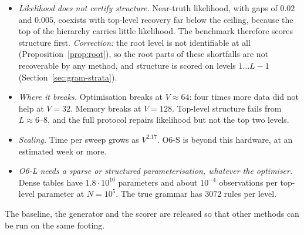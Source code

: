 \documentclass[11pt]{article}
\theoremstyle{definition}
\theoremstyle{remark}
\begin{document}
\begin{itemize}
  \item \emph{Likelihood does not certify structure.} Near-truth likelihood, with gaps of $0.02$ and $0.005$, coexists with top-level recovery far below the ceiling, because the top of the hierarchy carries little likelihood. The benchmark therefore scores structure first. \emph{Correction:} the root level is not identifiable at all (Proposition~\ref{prop:root}), so the root parts of these shortfalls are not recoverable by any method, and structure is scored on levels $1\dots L-1$ (Section~\ref{sec:gram-strata}).
  \item \emph{Where it breaks.} Optimisation breaks at $V\approx64$: four times more data did not help at $V{=}32$. Memory breaks at $V{=}128$. Top-level structure fails from $L\approx6$--$8$, and the full protocol repairs likelihood but not the top two levels.
  \item \emph{Scaling.} Time per sweep grows as $V^{2.17}$. O6-S is beyond this hardware, at an estimated week or more.
  \item \emph{O6-L needs a sparse or structured parameterisation, whatever the optimiser.} Dense tables have $1.8\cdot10^{10}$ parameters and about $10^{-4}$ observations per top-level parameter at $N=10^5$. The true grammar has $3072$ rules per level.
\end{itemize}
The baseline, the generator and the scorer are released so that other methods can be run on the same footing.
\end{document}
